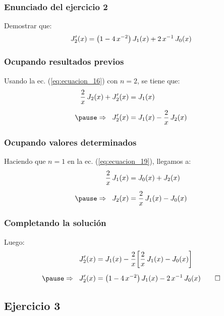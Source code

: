 \documentclass[12pt]{beamer}
\begin{document}
\begin{frame}
\frametitle{Enunciado del ejercicio 2}
Demostrar que:
\begin{align*}
{J}^{\prime}_{2}(x) = \big( 1 - 4 \, x^{-2} \big) \, J_{1}(x) + 2 \, x^{-1} \, J_{0} (x)
\end{align*}
\end{frame}
\begin{frame}
\frametitle{Ocupando resultados previos}
Usando la ec. (\ref{eq:ecuacion_16}) con $n = 2$, se tiene que:
\pause
\begin{eqnarray*}
\begin{aligned}
\dfrac{2}{x} \, J_{2}(x) + \pderivada{J}_{2}(x) &= J_{1}(x) \\[0.5em] \pause
\Rightarrow \hspace{0.2cm} \pderivada{J}_{2}(x) &= {J}_{1} (x) - \dfrac{2}{x} \, J_{2}(x)
\end{aligned}
\end{eqnarray*}
\end{frame}
\begin{frame}
\frametitle{Ocupando valores determinados}
Haciendo que $n = 1$ en la ec. (\ref{eq:ecuacion_19}), llegamos a:
\pause
\begin{align*}
\dfrac{2}{x} \, J_{1}(x) &= J_{0} (x) + J_{2}(x) \\[0.5em] \pause
\Rightarrow \hspace{0.2cm} J_{2}(x) &= \dfrac{2}{x} \, J_{1}(x) - J_{0}(x)
\end{align*}
\end{frame}
\begin{frame}
\frametitle{Completando la solución}
Luego:
\pause
\begin{eqnarray*}
\begin{aligned}
\pderivada{J}_{2}(x) &= J_{1}(x) - \dfrac{2}{x} \bigg[ \dfrac{2}{x} \, J_{1}(x) - J_{0}(x) \bigg] \\[0.5em] \pause
\Rightarrow \hspace{0.2cm} \pderivada{J}_{2} (x) &= \big( 1 - 4 \, x^{-2} \big) \, J_{1}(x) - 2 \, x^{-1} \, J_{0}(x) \qed
\end{aligned}
\end{eqnarray*}
\end{frame}

\subsection{Ejercicio 3}
\end{document}
